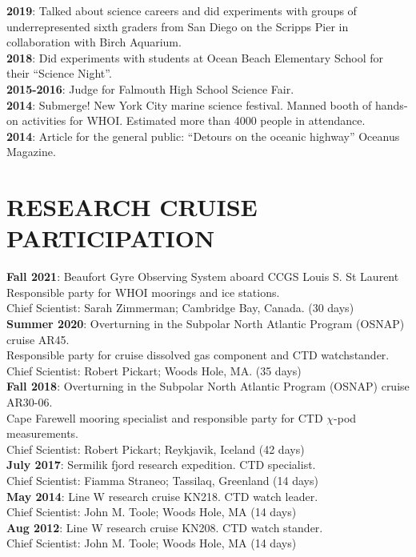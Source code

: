 \documentclass[paper=letter,fontsize=11pt]{scrartcl} %
\newcommand{\NewPart}[2]{\section*{\uppercase{#1} #2}}
\newcommand{\ShortEntry}[2]{\normalsize \noindent \textbf{#1}: #2 \\ }
\begin{document}
\ShortEntry{2019}{Talked about science careers and did experiments with groups of underrepresented sixth graders from San Diego on the Scripps Pier in collaboration with Birch Aquarium.}

\ShortEntry{2018}{Did experiments with students at Ocean Beach Elementary School for their ``Science Night''.}

\ShortEntry{2015-2016}{Judge for Falmouth High School Science Fair.}

\ShortEntry{2014}{Submerge! New York City marine science festival. Manned booth of hands-on activities for WHOI. Estimated more than 4000 people in attendance.}

\ShortEntry{2014}{Article for the general public: ``Detours on the oceanic highway'' Oceanus Magazine.}


\NewPart{Research Cruise Participation}{}

\ShortEntry{Fall 2021}{Beaufort Gyre Observing System aboard CCGS Louis S. St Laurent\\ Responsible party for WHOI moorings and ice stations.\\ Chief Scientist: Sarah Zimmerman; Cambridge Bay, Canada. (30 days)}

\ShortEntry{Summer 2020}{Overturning in the Subpolar North Atlantic Program (OSNAP) cruise AR45.\\ Responsible party for cruise dissolved gas component and CTD watchstander.\\ Chief Scientist: Robert Pickart; Woods Hole, MA. (35 days)}

\ShortEntry{Fall 2018}{Overturning in the Subpolar North Atlantic Program (OSNAP) cruise AR30-06.\\ Cape Farewell mooring specialist and responsible party for CTD $\chi$-pod measurements.\\ Chief Scientist: Robert Pickart; Reykjavik, Iceland (42 days)}

\ShortEntry{July 2017}{Sermilik fjord research expedition. CTD specialist.\\ Chief Scientist: Fiamma Straneo; Tassilaq, Greenland (14 days)}

\ShortEntry{May 2014}{Line W research cruise KN218. CTD watch leader.\\ Chief Scientist: John M. Toole; Woods Hole, MA (14 days)}

\ShortEntry{Aug 2012}{Line W research cruise KN208. CTD watch stander.\\ Chief Scientist: John M. Toole; Woods Hole, MA (14 days)}
\end{document}
